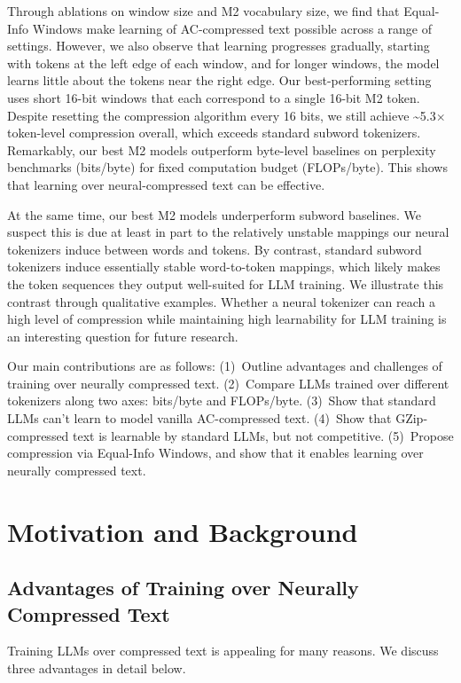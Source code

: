 Through ablations on window size and M2 vocabulary size, we find that Equal-Info Windows make learning of AC-compressed text possible across a range of settings. However, we also observe that learning progresses gradually, starting with tokens at the left edge of each window, and for longer windows, the model learns little about the tokens near the right edge. Our best-performing setting uses short 16-bit windows that each correspond to a single 16-bit M2 token. Despite resetting the compression algorithm every 16 bits, we still achieve \textasciitilde{}5.3$\times$ token-level compression overall, which exceeds standard subword tokenizers. Remarkably, our best M2 models outperform byte-level baselines on perplexity benchmarks (bits/byte) for fixed computation budget (FLOPs/byte). This shows that learning over neural-compressed text can be effective.

At the same time, our best M2 models underperform subword baselines. We suspect this is due at least in part to the relatively unstable mappings our neural tokenizers induce between words and tokens. By contrast, standard subword tokenizers induce essentially stable word-to-token mappings, which likely makes the token sequences they output well-suited for LLM training. We illustrate this contrast through qualitative examples. Whether a neural tokenizer can reach a high level of compression while maintaining high learnability for LLM training is an interesting question for future research.

Our main contributions are as follows: (1)~Outline advantages and challenges of training over neurally compressed text. (2)~Compare LLMs trained over different tokenizers along two axes: bits/byte and FLOPs/byte. (3)~Show that standard LLMs can't learn to model vanilla AC-compressed text. (4)~Show that GZip-compressed text is learnable by standard LLMs, but not competitive. (5)~Propose compression via Equal-Info Windows, and show that it enables learning over neurally compressed text.

\section{Motivation and Background}

\subsection{Advantages of Training over Neurally Compressed Text}

Training LLMs over compressed text is appealing for many reasons. We discuss three advantages in detail below.


